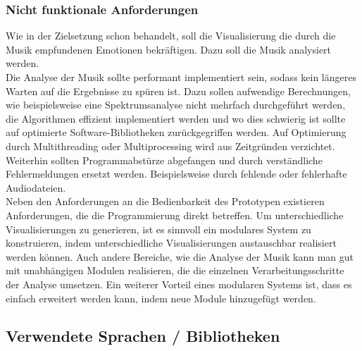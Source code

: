 \documentclass[11pt,a4paper]{article}
\begin{document}
\subsubsection{Nicht funktionale Anforderungen}
Wie in der Zielsetzung schon behandelt, soll die Visualisierung die durch die Musik empfundenen Emotionen bekräftigen. Dazu soll die Musik analysiert werden.\\
Die Analyse der Musik sollte performant implementiert sein, sodass kein längeres Warten auf die Ergebnisse zu spüren ist. Dazu sollen aufwendige Berechnungen, wie beispielsweise eine Spektrumsanalyse nicht mehrfach durchgeführt werden, die Algorithmen effizient implementiert werden und wo dies schwierig ist sollte auf optimierte Software-Bibliotheken zurückgegriffen werden. Auf Optimierung durch Multithreading oder Multiprocessing wird aus Zeitgründen verzichtet.\\
Weiterhin sollten Programmabstürze abgefangen und durch verständliche Fehlermeldungen ersetzt werden. Beispielsweise durch fehlende oder fehlerhafte Audiodateien.\\
Neben den Anforderungen an die Bedienbarkeit des Prototypen existieren Anforderungen, die die Programmierung direkt betreffen. Um unterschiedliche Visualisierungen zu generieren, ist es sinnvoll ein modulares System zu konstruieren, indem unterschiedliche Visualisierungen austauschbar realisiert werden können. Auch andere Bereiche, wie die Analyse der Musik kann man gut mit unabhängigen Modulen realisieren, die die einzelnen Verarbeitungsschritte der Analyse umsetzen. Ein weiterer Vorteil eines modularen Systems ist, dass es einfach erweitert werden kann, indem neue Module hinzugefügt werden.

\subsection{Verwendete Sprachen / Bibliotheken}
\end{document}

